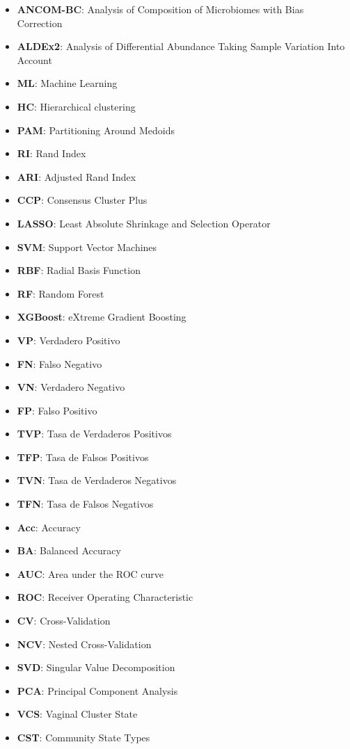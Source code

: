 \begin{itemize}
\item \textbf{ANCOM-BC}: Analysis of Composition of Microbiomes with Bias Correction
\item \textbf{ALDEx2}: Analysis of Differential Abundance Taking Sample Variation Into Account
\item \textbf{ML}: Machine Learning
\item \textbf{HC}: Hierarchical clustering
\item \textbf{PAM}: Partitioning Around Medoids
\item \textbf{RI}: Rand Index
\item \textbf{ARI}: Adjusted Rand Index
\item \textbf{CCP}: Consensus Cluster Plus
\item \textbf{LASSO}: Least Absolute Shrinkage and Selection Operator
\item \textbf{SVM}: Support Vector Machines
\item \textbf{RBF}: Radial Basis Function
\item \textbf{RF}: Random Forest
\item \textbf{XGBoost}: eXtreme Gradient Boosting 
\item \textbf{VP}: Verdadero Positivo
\item \textbf{FN}: Falso Negativo
\item \textbf{VN}: Verdadero Negativo
\item \textbf{FP}: Falso Positivo
\item \textbf{TVP}: Tasa de Verdaderos Positivos
\item \textbf{TFP}: Tasa de Falsos Positivos
\item \textbf{TVN}: Tasa de Verdaderos Negativos
\item \textbf{TFN}: Tasa de Falsos Negativos
\item \textbf{Acc}: Accuracy
\item \textbf{BA}: Balanced Accuracy
\item \textbf{AUC}: Area under the ROC curve
\item \textbf{ROC}: Receiver Operating Characteristic
\item \textbf{CV}: Cross-Validation
\item \textbf{NCV}: Nested Cross-Validation
\item \textbf{SVD}: Singular Value Decomposition
\item \textbf{PCA}: Principal Component Analysis
\item \textbf{VCS}: Vaginal Cluster State
\item \textbf{CST}: Community State Types
\end{itemize}